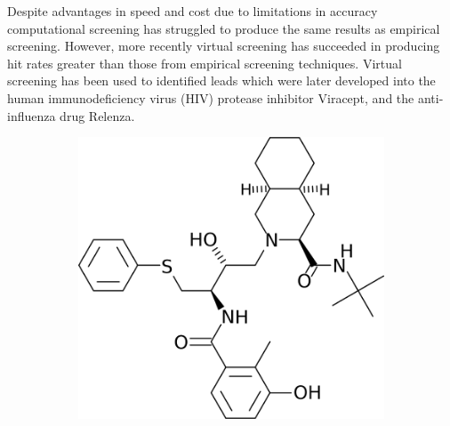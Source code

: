 Despite advantages in speed and cost due to limitations in accuracy computational screening has struggled to produce the same results as empirical screening.
However, more recently virtual screening has succeeded in producing hit rates greater than those from empirical screening techniques.
Virtual screening has been used to identified leads which were later developed into the human immunodeficiency virus (HIV) protease inhibitor Viracept, and the anti-influenza drug Relenza.
\begin{figure}[h]
    \centering
    \begin{subfigure}[b]{0.3\textwidth}
        \centering
        \includegraphics[width=\textwidth]{figures/nelfinavir_small.png}
        \label{fig:nelfinavir_chemical}
        \caption{}
    \end{subfigure}%
    \hspace{0.1\textwidth}
    \begin{subfigure}[b]{0.3\textwidth}
        \centering

\end{subfigure}
\end{figure}
